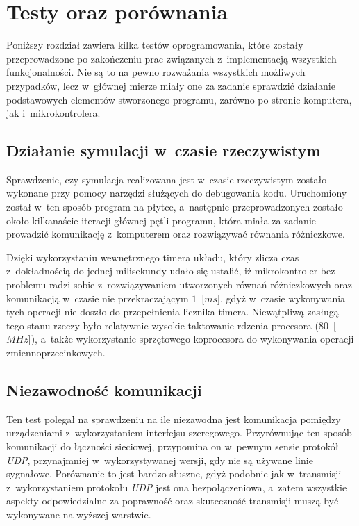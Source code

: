 \section{Testy oraz porównania}
\indent

Poniższy rozdział zawiera kilka testów oprogramowania, które zostały
przeprowadzone po zakończeniu prac związanych z~implementacją wszystkich
funkcjonalności. Nie są to na pewno rozważania wszystkich możliwych przypadków,
lecz w~głównej mierze miały one za zadanie sprawdzić działanie podstawowych
elementów stworzonego programu, zarówno po stronie komputera, jak
i~mikrokontrolera.

\subsection*{Działanie symulacji w~czasie rzeczywistym}
\indent

Sprawdzenie, czy symulacja realizowana jest w~czasie rzeczywistym zostało
wykonane przy pomocy narzędzi służących do debugowania kodu. Uruchomiony został
w~ten sposób program na płytce, a~następnie przeprowadzonych zostało około
kilkanaście iteracji głównej pętli programu, która miała za zadanie prowadzić
komunikację z~komputerem oraz rozwiązywać równania różniczkowe.

Dzięki wykorzystaniu wewnętrznego timera układu, który zlicza czas
z~dokładnością do jednej milisekundy udało się ustalić, iż mikrokontroler bez
problemu radzi sobie z~rozwiązywaniem utworzonych równań różniczkowych oraz
komunikacją w~czasie nie przekraczającym $1$~[$ms$], gdyż w~czasie wykonywania
tych operacji nie doszło do przepełnienia licznika timera. Niewątpliwą zasługą
tego stanu rzeczy było relatywnie wysokie taktowanie rdzenia procesora
($80$~[$MHz$]), a~także wykorzystanie sprzętowego koprocesora do wykonywania
operacji zmiennoprzecinkowych.

\subsection*{Niezawodność komunikacji}
\indent

Ten test polegał na sprawdzeniu na ile niezawodna jest komunikacja pomiędzy
urządzeniami z~wykorzystaniem interfejsu szeregowego. Przyrównując ten sposób
komunikacji do łączności sieciowej, przypomina on w~pewnym sensie protokół
\textit{UDP}, przynajmniej w~wykorzystywanej wersji, gdy nie są używane linie
sygnałowe. Porównanie to jest bardzo słuszne, gdyż podobnie jak w~transmisji
z~wykorzystaniem protokołu \textit{UDP} jest ona bezpołączeniowa, a~zatem
wszystkie aspekty odpowiedzialne za poprawność oraz skuteczność transmisji muszą
być wykonywane na wyższej warstwie.

